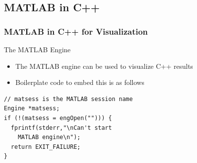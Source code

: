 \documentclass[compress]{beamer}
\begin{document}
\subsection{MATLAB in C++}

\begin{frame}[fragile]
	\frametitle{MATLAB in C++ for Visualization}
	\begin{block}{The MATLAB Engine}
		\begin{itemize}
		\item The MATLAB engine can be used to visualize C++ results
		\item Boilerplate code to embed this is as follows
		\end{itemize}
	\end{block}

\begin{lstlisting}
// matsess is the MATLAB session name
Engine *matsess;
if (!(matsess = engOpen(""))) {
  fprintf(stderr,"\nCan't start 
    MATLAB engine\n");
  return EXIT_FAILURE;
}
\end{lstlisting}

\end{frame}
\end{document}
